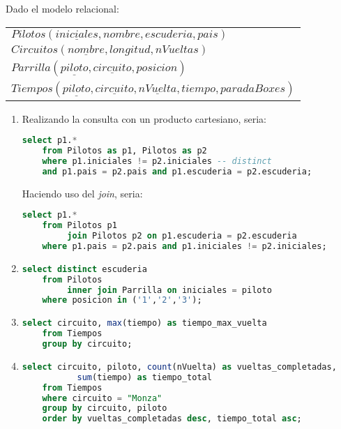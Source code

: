 Dado el modelo relacional:
\begin{center}
	\begin{tabular}{l}
		$Pilotos(\underline{iniciales}, nombre, escuderia, pais)$\\
		$Circuitos(\underline{nombre}, longitud, nVueltas)$\\
		$Parrilla(\underline{piloto}, \underline{circuito}, posicion)$\\				$Tiempos(\underline{piloto}, \underline{circuito}, \underline{nVuelta}, tiempo, paradaBoxes)$\\
	\end{tabular}
\end{center}

\begin{enumerate}

	\item 
	Realizando la consulta con un producto cartesiano, seria:
	\begin{lstlisting}[language=sql]
	select p1.*
	from Pilotos as p1, Pilotos as p2
	where p1.iniciales != p2.iniciales -- distinct
	and p1.pais = p2.pais and p1.escuderia = p2.escuderia;
	\end{lstlisting}
	
	Haciendo uso del \textit{join}, seria:
	\begin{lstlisting}[language=sql]
	select p1.*
	from Pilotos p1 
	     join Pilotos p2 on p1.escuderia = p2.escuderia
	where p1.pais = p2.pais and p1.iniciales != p2.iniciales;
	\end{lstlisting}
	
	\item 
	\begin{lstlisting}[language=sql]
	select distinct escuderia
	from Pilotos 
	     inner join Parrilla on iniciales = piloto
	where posicion in ('1','2','3');
	\end{lstlisting}
	
	\item 
	\begin{lstlisting}[language=sql]
	select circuito, max(tiempo) as tiempo_max_vuelta
	from Tiempos
	group by circuito;
	\end{lstlisting}

	\newpage
	\item 
	\begin{lstlisting}[language=sql]
	select circuito, piloto, count(nVuelta) as vueltas_completadas, 
	       sum(tiempo) as tiempo_total
	from Tiempos
	where circuito = "Monza"
	group by circuito, piloto
	order by vueltas_completadas desc, tiempo_total asc;
	\end{lstlisting}
	

\end{enumerate}
